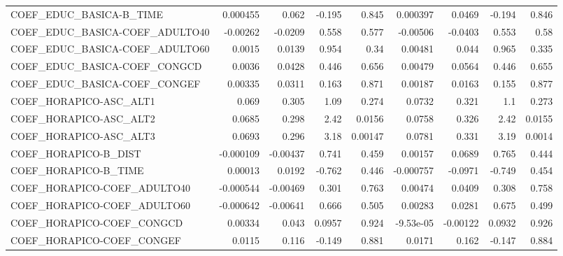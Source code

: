 \begin{tabular}{lrrrrrrrr}
COEF\_EDUC\_BASICA-B\_TIME           &    0.000455 &        0.062 &  -0.195 &    0.845 &   0.000397 &      0.0469 &       -0.194 &         0.846 \\
COEF\_EDUC\_BASICA-COEF\_ADULTO40    &    -0.00262 &      -0.0209 &   0.558 &    0.577 &   -0.00506 &     -0.0403 &        0.553 &          0.58 \\
COEF\_EDUC\_BASICA-COEF\_ADULTO60    &      0.0015 &       0.0139 &   0.954 &     0.34 &    0.00481 &       0.044 &        0.965 &         0.335 \\
COEF\_EDUC\_BASICA-COEF\_CONGCD      &      0.0036 &       0.0428 &   0.446 &    0.656 &    0.00479 &      0.0564 &        0.446 &         0.655 \\
COEF\_EDUC\_BASICA-COEF\_CONGEF      &     0.00335 &       0.0311 &   0.163 &    0.871 &    0.00187 &      0.0163 &        0.155 &         0.877 \\
COEF\_HORAPICO-ASC\_ALT1            &       0.069 &        0.305 &    1.09 &    0.274 &     0.0732 &       0.321 &          1.1 &         0.273 \\
COEF\_HORAPICO-ASC\_ALT2            &      0.0685 &        0.298 &    2.42 &   0.0156 &     0.0758 &       0.326 &         2.42 &        0.0155 \\
COEF\_HORAPICO-ASC\_ALT3            &      0.0693 &        0.296 &    3.18 &  0.00147 &     0.0781 &       0.331 &         3.19 &        0.0014 \\
COEF\_HORAPICO-B\_DIST              &   -0.000109 &     -0.00437 &   0.741 &    0.459 &    0.00157 &      0.0689 &        0.765 &         0.444 \\
COEF\_HORAPICO-B\_TIME              &     0.00013 &       0.0192 &  -0.762 &    0.446 &  -0.000757 &     -0.0971 &       -0.749 &         0.454 \\
COEF\_HORAPICO-COEF\_ADULTO40       &   -0.000544 &     -0.00469 &   0.301 &    0.763 &    0.00474 &      0.0409 &        0.308 &         0.758 \\
COEF\_HORAPICO-COEF\_ADULTO60       &   -0.000642 &     -0.00641 &   0.666 &    0.505 &    0.00283 &      0.0281 &        0.675 &         0.499 \\
COEF\_HORAPICO-COEF\_CONGCD         &     0.00334 &        0.043 &  0.0957 &    0.924 &  -9.53e-05 &    -0.00122 &       0.0932 &         0.926 \\
COEF\_HORAPICO-COEF\_CONGEF         &      0.0115 &        0.116 &  -0.149 &    0.881 &     0.0171 &       0.162 &       -0.147 &         0.884 \\

\end{tabular}
